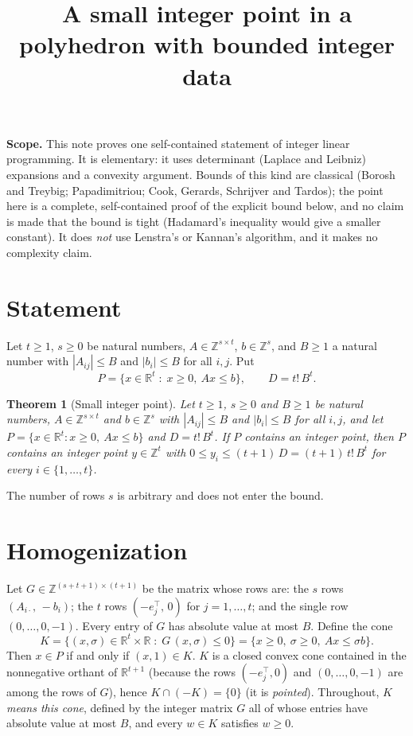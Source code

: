 \documentclass[11pt]{article}
\title{A small integer point in a polyhedron with bounded integer data}
\author{}
\date{}
\newtheorem{theorem}{Theorem}
\newcommand{\Z}{\mathbb Z}\newcommand{\R}{\mathbb R}\newcommand{\Q}{\mathbb Q}
\begin{document}
\maketitle

\noindent\textbf{Scope.} This note proves one self-contained statement of integer linear programming. It is elementary: it uses determinant (Laplace and Leibniz) expansions and a convexity argument. Bounds of this kind are classical (Borosh and Treybig; Papadimitriou; Cook, Gerards, Schrijver and Tardos); the point here is a complete, self-contained proof of the explicit bound below, and no claim is made that the bound is tight (Hadamard's inequality would give a smaller constant). It does \emph{not} use Lenstra's or Kannan's algorithm, and it makes no complexity claim.

\section{Statement}

Let $t\ge 1$, $s\ge 0$ be natural numbers, $A\in\Z^{s\times t}$, $b\in\Z^{s}$, and $B\ge 1$ a natural number with $|A_{ij}|\le B$ and $|b_i|\le B$ for all $i,j$. Put
\[
P=\{x\in\R^{t}\;:\;x\ge 0,\ Ax\le b\},\qquad D=t!\,B^{t}.
\]

\begin{theorem}[Small integer point]\label{thm:sip}
Let $t\ge1$, $s\ge0$ and $B\ge1$ be natural numbers, $A\in\Z^{s\times t}$ and $b\in\Z^{s}$ with $|A_{ij}|\le B$ and $|b_i|\le B$ for all $i,j$, and let $P=\{x\in\R^{t}: x\ge0,\ Ax\le b\}$ and $D=t!\,B^{t}$. If $P$ contains an integer point, then $P$ contains an integer point $y\in\Z^t$ with $0\le y_i\le (t+1)\,D=(t+1)\,t!\,B^{t}$ for every $i\in\{1,\dots,t\}$.
\end{theorem}

The number of rows $s$ is arbitrary and does not enter the bound.

\section{Homogenization}

Let $G\in\Z^{(s+t+1)\times(t+1)}$ be the matrix whose rows are: the $s$ rows $(A_{i\cdot},\,-b_i)$; the $t$ rows $(-e_j^{\top},\,0)$ for $j=1,\dots,t$; and the single row $(0,\dots,0,-1)$. Every entry of $G$ has absolute value at most $B$. Define the cone
\[
K=\{(x,\sigma)\in\R^{t}\times\R\;:\;G\,(x,\sigma)\le 0\}=\{x\ge0,\ \sigma\ge 0,\ Ax\le \sigma b\}.
\]
Then $x\in P$ if and only if $(x,1)\in K$. $K$ is a closed convex cone contained in the nonnegative orthant of $\R^{t+1}$ (because the rows $(-e_j^\top,0)$ and $(0,\dots,0,-1)$ are among the rows of $G$), hence $K\cap(-K)=\{0\}$ (it is \emph{pointed}). Throughout, \emph{$K$ means this cone}, defined by the integer matrix $G$ all of whose entries have absolute value at most $B$, and every $w\in K$ satisfies $w\ge0$.
\end{document}
